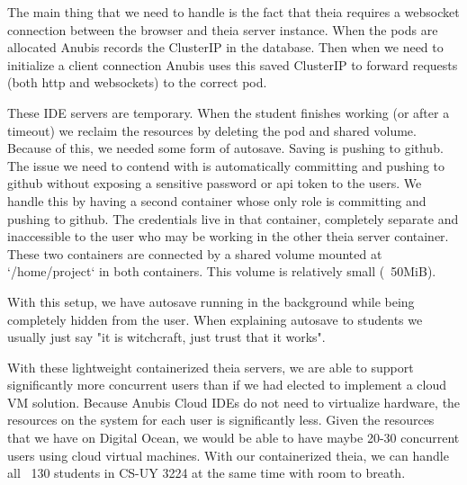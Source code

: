The main thing that we need to handle is the fact that theia requires a websocket connection between the browser and
theia server instance. When the pods are allocated Anubis records the ClusterIP in the database. Then when we need to
initialize a client connection Anubis uses this saved ClusterIP to forward requests (both http and websockets) to the
correct pod.

These IDE servers are temporary. When the student finishes working (or after a timeout) we reclaim the resources by
deleting the pod and shared volume. Because of this, we needed some form of autosave. Saving is pushing to github.
The issue we need to contend with is automatically committing and pushing to github without exposing a sensitive
password or api token to the users. We handle this by having a second container whose only role is committing and
pushing to github. The credentials live in that container, completely separate and inaccessible to the user who
may be working in the other theia server container. These two containers are connected by a shared volume mounted
at `/home/project` in both containers. This volume is relatively small (~50MiB).

With this setup, we have autosave running in the background while being completely hidden from the user. When
explaining autosave to students we usually just say "it is witchcraft, just trust that it works".


With these lightweight containerized theia servers, we are able to support significantly more concurrent users than
if we had elected to implement a cloud VM solution. Because Anubis Cloud IDEs do not need to virtualize hardware,
the resources on the system for each user is significantly less. Given the resources that we have on Digital Ocean,
we would be able to have maybe 20-30 concurrent users using cloud virtual machines. With our containerized theia,
we can handle all ~130 students in CS-UY 3224 at the same time with room to breath.
